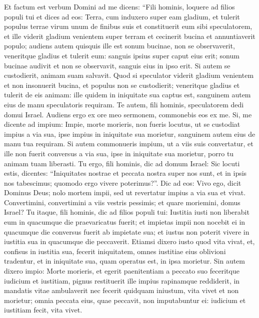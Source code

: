 \begin{biblechapter}  
\verse Et factum est verbum Domini ad me dicens: 
\verse “Fili hominis, loquere ad filios populi tui et dices ad eos: Terra, cum induxero super eam gladium, et tulerit populus terrae virum unum de finibus suis et constituerit eum sibi speculatorem, 
\verse et ille viderit gladium venientem super terram et cecinerit bucina et annuntiaverit populo; 
\verse audiens autem quisquis ille est sonum bucinae, non se observaverit, veneritque gladius et tulerit eum: sanguis ipsius super caput eius erit; 
\verse sonum bucinae audivit et non se observavit, sanguis eius in ipso erit. Si autem se custodierit, animam suam salvavit. 
\verse Quod si speculator viderit gladium venientem et non insonuerit bucina, et populus non se custodierit; veneritque gladius et tulerit de eis animam: ille quidem in iniquitate sua captus est, sanguinem autem eius de manu speculatoris requiram. 
\verse Te autem, fili hominis, speculatorem dedi domui Israel. Audiens ergo ex ore meo sermonem, commonebis eos ex me. 
\verse Si, me dicente ad impium: Impie, morte morieris, non fueris locutus, ut se custodiat impius a via sua, ipse impius in iniquitate sua morietur, sanguinem autem eius de manu tua requiram. 
\verse Si autem commonueris impium, ut a viis suis convertatur, et ille non fuerit conversus a via sua, ipse in iniquitate sua morietur, porro tu animam tuam liberasti. 
\verse Tu ergo, fili hominis, dic ad domum Israel: Sic locuti estis, dicentes: “Iniquitates nostrae et peccata nostra super nos sunt, et in ipsis nos tabescimus; quomodo ergo vivere poterimus?”. 
\verse Dic ad eos: Vivo ego, dicit Dominus Deus; nolo mortem impii, sed ut revertatur impius a via sua et vivat. Convertimini, convertimini a viis vestris pessimis; et quare moriemini, domus Israel? 
\verse Tu itaque, fili hominis, dic ad filios populi tui: Iustitia iusti non liberabit eum in quacumque die praevaricatus fuerit; et impietas impii non nocebit ei in quacumque die conversus fuerit ab impietate sua; et iustus non poterit vivere in iustitia sua in quacumque die peccaverit. 
\verse Etiamsi dixero iusto quod vita vivat, et, confisus in iustitia sua, fecerit iniquitatem, omnes iustitiae eius oblivioni tradentur, et in iniquitate sua, quam operatus est, in ipsa morietur. 
\verse Sin autem dixero impio: Morte morieris, et egerit paenitentiam a peccato suo feceritque iudicium et iustitiam, 
\verse pignus restituerit ille impius rapinamque reddiderit, in mandatis vitae ambulaverit nec fecerit quidquam iniustum, vita vivet et non morietur; 
\verse omnia peccata eius, quae peccavit, non imputabuntur ei: iudicium et iustitiam fecit, vita vivet. 

\end{biblechapter}
